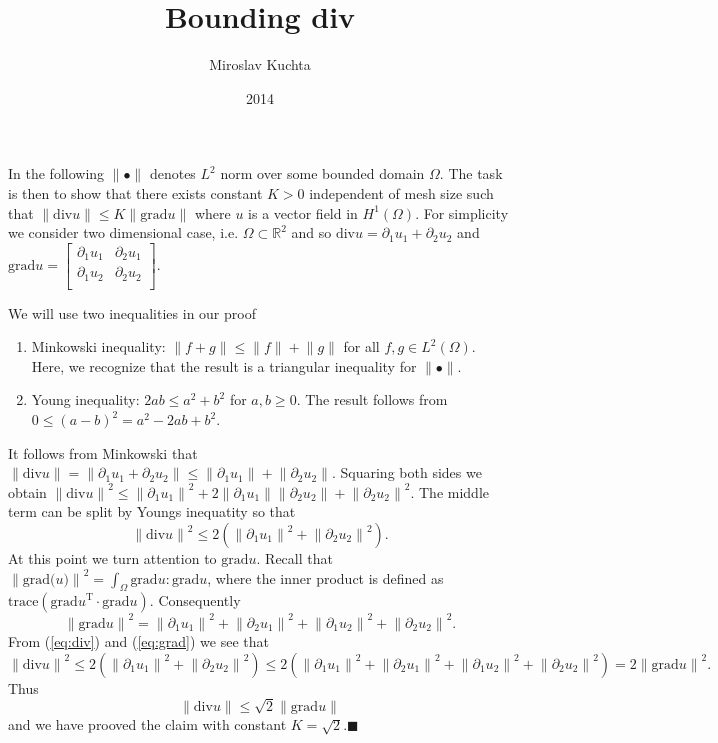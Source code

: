 \documentclass[a4paper,11pt]{article}
\title{Bounding div}
\author{Miroslav Kuchta}
\date{2014}
\newcommand{\norm}[1]{\ensuremath{\|#1\|}}
\newcommand{\Div}[1] {\ensuremath{\text{div}#1}}
\newcommand{\Grad}[1]{\ensuremath{\text{grad}#1}}
\begin{document}
\maketitle

In the following $\norm{\bullet}$ denotes $L^2$ norm over some bounded domain
$\Omega$. The task is then to show that there exists constant $K>0$
independent of mesh size such that $\norm{\Div{u}} \leq K\norm{\Grad{u}}$ where $u$ is a vector field in $H^1(\Omega)$. For simplicity we consider two
dimensional case, i.e. $\Omega\subset\mathbb{R}^2$ and so $\Div{u}=\partial_1u_1 + \partial_2u_2$ and
$\Grad{u}=\begin{bmatrix}
\partial_1u_1 & \partial_2u_1\\
\partial_1u_2 & \partial_2u_2\\
\end{bmatrix}$.

We will use two inequalities in our proof
\begin{enumerate}
\item Minkowski inequality: $\norm{f+g} \leq \norm{f} + \norm{g}$ for all
 $f, g\in L^2(\Omega)$. Here, we recognize that the result is a triangular inequality for $\norm{\bullet}$.
\item Young inequality: $2ab \leq a^2 + b^2$ for $a, b \geq 0$. The result follows from $0 \leq (a-b)^2 = a^2 -2ab + b^2$.  
\end{enumerate}

It follows from Minkowski that $\norm{\Div{u}}=\norm{\partial_1u_1 + \partial_2u_2}\leq \norm{\partial_1u_1} + \norm{\partial_2u_2}$. Squaring both
sides we obtain 
$\norm{\Div{u}}^2 \leq \norm{\partial_1u_1}^2 + 2\norm{\partial_1u_1}\norm{\partial_2u_2} +\norm{\partial_2u_2}^2$. The middle
term can be split by Youngs inequatity so that 
\begin{equation}
\label{eq:div}
\norm{\Div{u}}^2 \leq 2\left(\norm{\partial_1u_1}^2 + \norm{\partial_2u_2}^2\right).
\end{equation}
At this point we turn attention to $\Grad{u}$. Recall that $\norm{\Grad(u)}^2=\int_{\Omega} \Grad{u}:\Grad{u}$, where the inner product is
defined as $\text{trace}\left(\Grad{u}^{\text{T}} \cdot \Grad{u}\right)$.
Consequently
\begin{equation}
\label{eq:grad}
\norm{\Grad{u}}^2 = \norm{\partial_1u_1}^2 + \norm{\partial_2u_1}^2               
                   +\norm{\partial_1u_2}^2 + \norm{\partial_2u_2}^2.
\end{equation}
From (\ref{eq:div}) and (\ref{eq:grad}) we see that 
\[
 \norm{\Div{u}}^2 \leq 2\left(\norm{\partial_1u_1}^2 + \norm{\partial_2u_2}^2\right) \leq 2\left(\norm{\partial_1u_1}^2 + \norm{\partial_2u_1}^2               
                    +\norm{\partial_1u_2}^2 + \norm{\partial_2u_2}^2\right)=
                    2\norm{\Grad{u}}^2.
\]
Thus
\[
\norm{\Div{u}} \leq \sqrt{2} \norm{\Grad{u}}
\]
and we have prooved the claim with constant $K=\sqrt{2}$.\hfill$\blacksquare$
\end{document}
